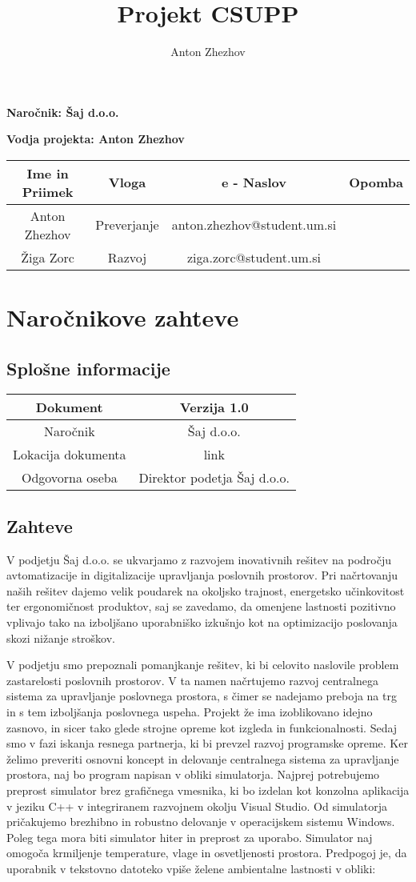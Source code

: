 \documentclass[a4paper,12pt]{article}
\title{Projekt CSUPP}
\author{Anton Zhezhov}
\makeatletter
\renewcommand{\maketitle}{
	\begin{center}
	{\huge\bfseries
	\thetitle}
	\end{center}

	\vspace{1cm}

	\centerline{\textbf{Naročnik: Šaj d.o.o.}}
	\centerline{\textbf{Vodja projekta: Anton Zhezhov}}

	\vspace{1cm}

	\leftline{\textbf{Začetek: 09.10.2019 } \hfill \textbf{Konec: 00.00.2020}}

	\vspace{4cm}

	\begin{center}
	
			\begin{tabular}{c|c|c|c}
					Ime in Priimek&Vloga	  &e - Naslov						&Opomba\\
				\hline
					Anton Zhezhov &Preverjanje&anton.zhezhov@student.um.si & 		\\
				\hline
					Žiga Zorc	  &Razvoj	  &ziga.zorc@student.um.si 	   &		\\
			\end{tabular}
	
	\end{center}
}
\makeatother
\begin{document}
\maketitle

\setlength{\titlewidth}{16cm}

\newpage

\section{Naročnikove zahteve}
	\subsection{Splošne informacije}
			\begin{center}
				\begin{tabular}{c|c}
						Dokument & Verzija 1.0 \\
						\hline
						Naročnik & Šaj d.o.o. \\
						\hline
						Lokacija dokumenta & link \\
						\hline
						Odgovorna oseba & Direktor podetja Šaj d.o.o. \\
				\end{tabular}
			\end{center}
	\subsection{Zahteve}
 
	\hspace{1em} V podjetju Šaj d.o.o. se ukvarjamo z razvojem inovativnih rešitev na področju 
	avtomatizacije in digitalizacije upravljanja poslovnih prostorov. Pri načrtovanju 
	naših rešitev dajemo velik poudarek na okoljsko trajnost, energetsko učinkovitost 
	ter ergonomičnost produktov, saj se zavedamo, da omenjene lastnosti pozitivno vplivajo 
	tako na izboljšano uporabniško izkušnjo kot na optimizacijo poslovanja skozi nižanje 
	stroškov.
	
	V podjetju smo prepoznali pomanjkanje rešitev, ki bi celovito naslovile 
	problem zastarelosti poslovnih prostorov. V ta namen načrtujemo razvoj centralnega 
	sistema za upravljanje poslovnega prostora, s čimer se nadejamo preboja na trg 
	in s tem izboljšanja poslovnega uspeha. Projekt že ima izoblikovano idejno zasnovo, 
	in sicer tako glede strojne opreme kot izgleda in funkcionalnosti. Sedaj smo v fazi 
	iskanja resnega partnerja, ki bi prevzel razvoj programske opreme. Ker želimo preveriti 
	osnovni koncept in delovanje centralnega sistema za upravljanje prostora, naj bo program 
	napisan v obliki simulatorja. Najprej potrebujemo preprost simulator brez grafičnega 
	vmesnika, ki bo izdelan kot konzolna aplikacija v jeziku C++ v integriranem razvojnem 
	okolju Visual Studio. Od simulatorja pričakujemo brezhibno in robustno delovanje v 
	operacijskem sistemu Windows. Poleg tega mora biti simulator hiter in preprost za uporabo. 
	Simulator naj omogoča krmiljenje temperature, vlage in osvetljenosti prostora. Predpogoj 
	je, da uporabnik v tekstovno datoteko vpiše želene ambientalne lastnosti v obliki: 
	
\end{document}

